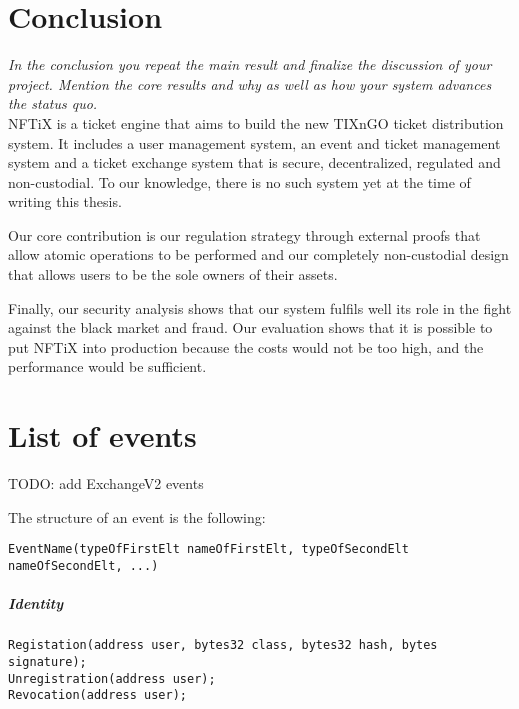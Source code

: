 \documentclass[a4paper,11pt,oneside]{report}
\begin{document}
\chapter{Conclusion}

\textit{In the conclusion you repeat the main result and finalize the discussion of
your project. Mention the core results and why as well as how your system
advances the status quo.} \\

NFTiX is a ticket engine that aims to build the new TIXnGO ticket distribution system. It includes a user management system, an event and ticket management system and a ticket exchange system that is secure, decentralized, regulated and non-custodial. To our knowledge, there is no such system yet at the time of writing this thesis.

Our core contribution is our regulation strategy through external proofs that allow atomic operations to be performed and our completely non-custodial design that allows users to be the sole owners of their assets.

Finally, our security analysis shows that our system fulfils well its role in the fight against the black market and fraud. Our evaluation shows that it is possible to put NFTiX into production because the costs would not be too high, and the performance would be sufficient.


\cleardoublepage
{}
{}
\nocite{*}
\printbibliography

\appendix
\chapter{List of events}
\label{sec:appendix_a}

TODO: add ExchangeV2 events

The structure of an event is the following: 
\begin{verbatim}
EventName(typeOfFirstElt nameOfFirstElt, typeOfSecondElt nameOfSecondElt, ...)
\end{verbatim}



\paragraph{Identity}
\begin{verbatim}
Registation(address user, bytes32 class, bytes32 hash, bytes signature);
Unregistration(address user);
Revocation(address user);
\end{verbatim}
\end{document}
